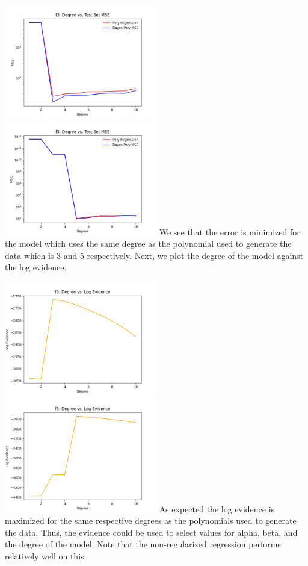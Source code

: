 \documentclass{article}
\begin{document}
\includegraphics[width=0.5\textwidth]{../output/task2f3.png}
\includegraphics[width=0.5\textwidth]{../output/task2f5.png}
We see that the error is minimized for the model which uses the same degree as the polynomial used to generate the data which is 3 and 5 respectively. Next, we plot the degree of the model against the log evidence.

\includegraphics[width=0.5\textwidth]{../output/task2f3evid.png}
\includegraphics[width=0.5\textwidth]{../output/task2f5evid.png}
As expected the log evidence is maximized for the same respective degrees as the polynomials used to generate the data. Thus, the evidence could be used to select values for alpha, beta, and the degree of the model. Note that the non-regularized regression performs relatively well on this. 
\end{document}
